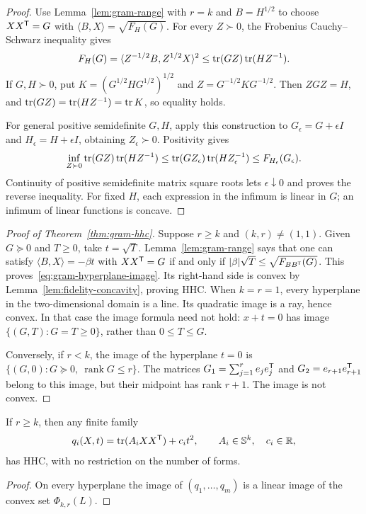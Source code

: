 \begin{proof}
Use Lemma~\ref{lem:gram-range} with $r=k$ and $B=H^{1/2}$ to choose
$XX^{\mathsf T}=G$ with $\langle B,X\rangle=\sqrt{F_H(G)}$.
For every $Z\succ0$, the Frobenius Cauchy--Schwarz inequality gives
\[
 F_H(G)=\langle Z^{-1/2}B,Z^{1/2}X\rangle^2
 \leq\operatorname{tr}(GZ)\operatorname{tr}(HZ^{-1}).
\]
If $G,H\succ0$, put $K=(G^{1/2}HG^{1/2})^{1/2}$ and
$Z=G^{-1/2}KG^{-1/2}$. Then $ZGZ=H$, and
$\operatorname{tr}(GZ)=\operatorname{tr}(HZ^{-1})=\operatorname{tr} K$, so equality holds.

For general positive semidefinite $G,H$, apply this construction to
$G_\epsilon=G+\epsilon I$ and $H_\epsilon=H+\epsilon I$, obtaining
$Z_\epsilon\succ0$. Positivity gives
\[
 \inf_{Z\succ0}\operatorname{tr}(GZ)\operatorname{tr}(HZ^{-1})
 \leq\operatorname{tr}(GZ_\epsilon)\operatorname{tr}(HZ_\epsilon^{-1})
 \leq F_{H_\epsilon}(G_\epsilon).
\]
Continuity of positive semidefinite matrix square roots lets
$\epsilon\downarrow0$ and proves the reverse inequality.
For fixed $H$, each expression in the infimum is linear in $G$;
an infimum of linear functions is concave.
\end{proof}

\begin{proof}[Proof of Theorem~\ref{thm:gram-hhc}]
Suppose $r\geq k$ and $(k,r)\ne(1,1)$. Given $G\succeq0$ and
$T\geq0$, take $t=\sqrt T$. Lemma~\ref{lem:gram-range} says that
one can satisfy $\langle B,X\rangle=-\beta t$ with $XX^{\mathsf T}=G$
if and only if $|\beta|\sqrt T\leq\sqrt{F_{BB^{\mathsf T}}(G)}$.
This proves~\eqref{eq:gram-hyperplane-image}. Its right-hand side
is convex by Lemma~\ref{lem:fidelity-concavity}, proving HHC.
When $k=r=1$, every hyperplane in the two-dimensional domain is a
line. Its quadratic image is a ray, hence convex. In that case the
image formula need not hold: $x+t=0$ has image
$\{(G,T):G=T\geq0\}$, rather than $0\leq T\leq G$.

Conversely, if $r<k$, the image of the hyperplane $t=0$ is
$\{(G,0):G\succeq0,\ \operatorname{rank}G\leq r\}$.
The matrices $G_1=\sum_{j=1}^r e_je_j^{\mathsf T}$ and
$G_2=e_{r+1}e_{r+1}^{\mathsf T}$ belong to this image, but their
midpoint has rank $r+1$. The image is not convex.
\end{proof}

\begin{corollary}\label{cor:gram-family}
If $r\geq k$, then any finite family
\[
 q_i(X,t)=\operatorname{tr}(A_iXX^{\mathsf T})+c_it^2,
 \qquad A_i\in\mathbb S^k,\quad c_i\in\mathbb R,
\]
has HHC, with no restriction on the number of forms.
\end{corollary}
\begin{proof}
On every hyperplane the image of $(q_1,\ldots,q_m)$ is a linear
image of the convex set $\Phi_{k,r}(L)$.
\end{proof}

